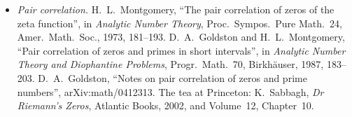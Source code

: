 \begin{itemize}
\item \emph{Pair correlation.} H.~L.~Montgomery, ``The pair correlation of zeros of the zeta function'', in \emph{Analytic Number Theory}, Proc.\ Sympos.\ Pure Math.\ 24, Amer.\ Math.\ Soc., 1973, 181--193. D.~A.~Goldston and H.~L.~Montgomery, ``Pair correlation of zeros and primes in short intervals'', in \emph{Analytic Number Theory and Diophantine Problems}, Progr.\ Math.\ 70, Birkhäuser, 1987, 183--203. D.~A.~Goldston, ``Notes on pair correlation of zeros and prime numbers'', arXiv:math/0412313. The tea at Princeton: K.~Sabbagh, \emph{Dr Riemann's Zeros}, Atlantic Books, 2002, and Volume~12, Chapter~10.
\end{itemize}
